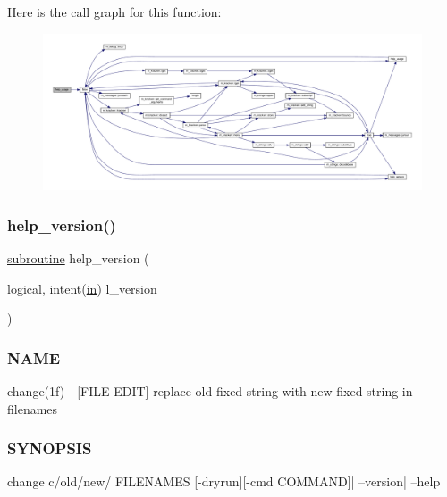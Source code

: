 Here is the call graph for this function\+:
\nopagebreak
\begin{figure}[H]
\begin{center}
\leavevmode
\includegraphics[width=350pt]{change_8f90_a3e09a3b52ee8fb04eeb93fe5761626a8_cgraph}
\end{center}
\end{figure}
\mbox{\label{change_8f90_a39c21619b08a3c22f19e2306efd7f766}} 
\subsubsection{\texorpdfstring{help\+\_\+version()}{help\_version()}}
{\footnotesize\ttfamily \hyperlink{M__stopwatch_83_8txt_acfbcff50169d691ff02d4a123ed70482}{subroutine} help\+\_\+version (\begin{DoxyParamCaption}\item[{logical, intent(\hyperlink{M__journal_83_8txt_afce72651d1eed785a2132bee863b2f38}{in})}]{l\+\_\+version }\end{DoxyParamCaption})}



\subsubsection*{N\+A\+ME}

change(1f) -\/ \mbox{[}F\+I\+LE E\+D\+IT\mbox{]} replace old fixed string with new fixed string in filenames 

\subsubsection*{S\+Y\+N\+O\+P\+S\+IS}

\begin{DoxyVerb}change c/old/new/ FILENAMES [-dryrun][-cmd COMMAND]| --version| --help
\end{DoxyVerb}


